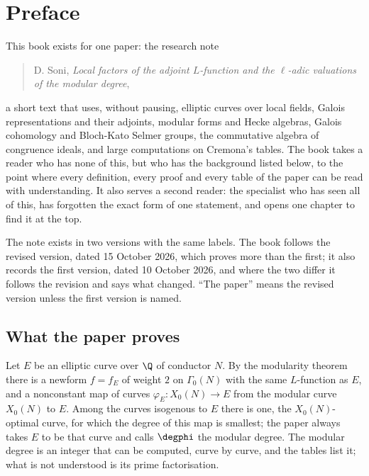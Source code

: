 \chapter*{Preface}

This book exists for one paper: the research note
\begin{quote}
D. Soni, \emph{Local factors of the adjoint $L$-function and the $\ell$-adic valuations of the
modular degree},
\end{quote}
a short text that uses, without pausing, elliptic curves over local fields, Galois representations
and their adjoints, modular forms and Hecke algebras, Galois cohomology and Bloch-Kato Selmer
groups, the commutative algebra of congruence ideals, and large computations on Cremona's tables.
The book takes a reader who has none of this, but who has the background listed below, to the
point where every definition, every proof and every table of the paper can be read with
understanding. It also serves a second reader: the specialist who has seen all of this, has
forgotten the exact form of one statement, and opens one chapter to find it at the top.

The note exists in two versions with the same labels. The book follows the revised version, dated
15 October 2026, which proves more than the first; it also records the first version, dated
10 October 2026, and where the two differ it follows the revision and says what changed.
``The paper'' means the revised version unless the first version is named.

\section*{What the paper proves}

Let $E$ be an elliptic curve over $\Q$ of conductor $N$. By the modularity theorem there is a
newform $f=f_E$ of weight $2$ on $\Gamma_0(N)$ with the same $L$-function as $E$, and a nonconstant
map of curves $\varphi_E\colon X_0(N)\to E$ from the modular curve $X_0(N)$ to $E$. Among the
curves isogenous to $E$ there is one, the $X_0(N)$-optimal curve, for which the degree of this map
is smallest; the paper always takes $E$ to be that curve and calls $\degphi$ the modular degree.
The modular degree is an integer that can be computed, curve by curve, and the tables list it;
what is not understood is its prime factorisation.

